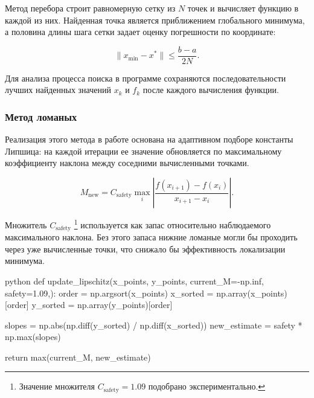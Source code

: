 Метод перебора строит равномерную сетку из $N$ точек и вычисляет функцию в каждой
из них. Найденная точка является приближением глобального минимума, а половина
длины шага сетки задает оценку погрешности по координате:

\[
\|x_{\min} - x^*\| \leq \frac{b-a}{2N}.
\]

Для анализа процесса поиска в программе сохраняются последовательности лучших
найденных значений $x_k$ и $f_k$ после каждого вычисления функции.

\subsubsection{Метод ломаных}

Реализация этого метода в работе основана на адаптивном подборе константы Липшица:
на каждой итерации ее значение обновляется по максимальному коэффициенту наклона 
между соседними вычисленными точками.

\begin{equation}
M_{\mathrm{new}} = C_{\mathrm{safety}} \max_i
\left|
\frac{f(x_{i+1})-f(x_i)}{x_{i+1}-x_i}
\right|.
\end{equation}

Множитель $C_{\mathrm{safety}}$ \footnote{Значение множителя 
$C_{\mathrm{safety}} = 1.09$ подобрано
экспериментально.} используется как запас относительно
наблюдаемого максимального наклона.
Без этого запаса нижние ломаные могли бы проходить через уже вычисленные
точки, что снижало бы эффективность локализации минимума.

\begin{mintedbox}{python}
    def update_lipschitz(x_points, y_points, current_M=-np.inf, safety=1.09,):
        order = np.argsort(x_points)
        x_sorted = np.array(x_points)[order]
        y_sorted = np.array(y_points)[order]
        
        slopes = np.abs(np.diff(y_sorted) / np.diff(x_sorted))
        new_estimate = safety * np.max(slopes)

        return max(current_M, new_estimate)
\end{mintedbox}

\newpage

